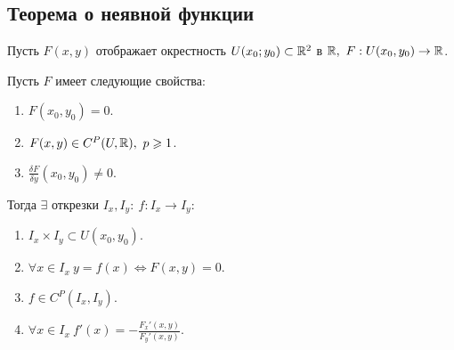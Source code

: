 \setcounter{subsection}{15}

\subsection{Теорема о неявной функции}

\begin{theorem}\label{theorem:1}
    Пусть $ F(x,y) $ отображает окрестность $ U(x_0;y_0) \subset \mathbb{R}^2 $ в $ \R, \ F:U(x_0,y_0)\rightarrow\R $.

    Пусть $ F $ имеет следующие свойства:
    \begin{enumerate}
        \item $ F(x_0,y_0) = 0 $.
        \item $ F(x,y) \in C^P(U,\mathbb{R}), \ p \geqslant 1 $.
        \item $ \frac{\delta F}{\delta y}(x_0,y_0)\ne 0 $.
    \end{enumerate}

    Тогда $ \exists $ открезки $ I_x,I_y: \ f:I_x \rightarrow I_y $:
    \begin{enumerate}
        \item $ I_x \times I_y \subset U(x_0,y_0) $.
        \item $ \forall x \in I_x \ y = f(x) \iff F(x,y) = 0 $.
        \item $ f \in C^P(I_x,I_y) $.
        \item $ \forall x \in I_x \ f'(x) = -\frac{F_x'(x,y)}{F_y'(x,y)} $.
    \end{enumerate}
\end{theorem}

